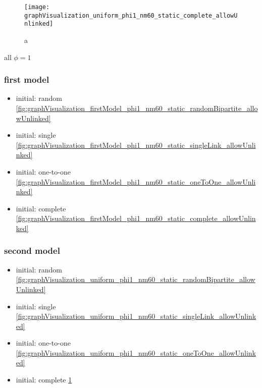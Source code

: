 \begin{figure}
  \centering
  \texttt{[image: graphVisualization\_uniform\_phi1\_nm60\_static\_complete\_allowUnlinked]}
  \caption{a}
  \label{fig:graphVisualization_uniform_phi1_nm60_static_complete_allowUnlinked}
\end{figure}

all $\phi=1$

\subsubsection{first model}

\begin{itemize}
\item initial: random \ref{fig:graphVisualization_firstModel_phi1_nm60_static_randomBipartite_allowUnlinked}
\item initial: single \ref{fig:graphVisualization_firstModel_phi1_nm60_static_singleLink_allowUnlinked}
\item initial: one-to-one \ref{fig:graphVisualization_firstModel_phi1_nm60_static_oneToOne_allowUnlinked}
\item initial: complete \ref{fig:graphVisualization_firstModel_phi1_nm60_static_complete_allowUnlinked}
\end{itemize}

\subsubsection{second model}

\begin{itemize}
\item initial: random \ref{fig:graphVisualization_uniform_phi1_nm60_static_randomBipartite_allowUnlinked}
\item initial: single \ref{fig:graphVisualization_uniform_phi1_nm60_static_singleLink_allowUnlinked}
\item initial: one-to-one \ref{fig:graphVisualization_uniform_phi1_nm60_static_oneToOne_allowUnlinked}
\item initial: complete \ref{fig:graphVisualization_uniform_phi1_nm60_static_complete_allowUnlinked}
\end{itemize}


